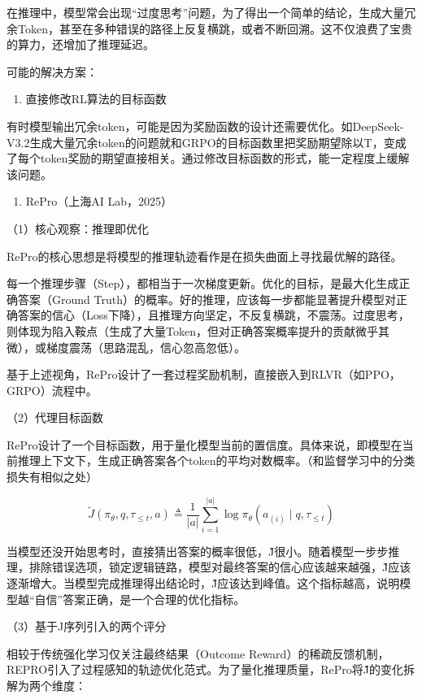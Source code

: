 在推理中，模型常会出现``过度思考''问题，为了得出一个简单的结论，生成大量冗余Token，甚至在多种错误的路径上反复横跳，或者不断回溯。这不仅浪费了宝贵的算力，还增加了推理延迟。

可能的解决方案：

\begin{enumerate}
\def\labelenumi{\arabic{enumi}.}
\tightlist
\item
  直接修改RL算法的目标函数
\end{enumerate}

有时模型输出冗余token，可能是因为奖励函数的设计还需要优化。如DeepSeek-V3.2生成大量冗余token的问题就和GRPO的目标函数里把奖励期望除以T，变成了每个token奖励的期望直接相关。通过修改目标函数的形式，能一定程度上缓解该问题。

\begin{enumerate}
\def\labelenumi{\arabic{enumi}.}
\setcounter{enumi}{1}
\tightlist
\item
  RePro（上海AI Lab，2025）
\end{enumerate}

（1）核心观察：推理即优化

RePro的核心思想是将模型的推理轨迹看作是在损失曲面上寻找最优解的路径。

每一个推理步骤（Step），都相当于一次梯度更新。优化的目标，是最大化生成正确答案（Ground Truth）的概率。好的推理，应该每一步都能显著提升模型对正确答案的信心（Loss下降），且推理方向坚定，不反复横跳，不震荡。过度思考，则体现为陷入鞍点（生成了大量Token，但对正确答案概率提升的贡献微乎其微），或梯度震荡（思路混乱，信心忽高忽低）。

基于上述视角，RePro设计了一套过程奖励机制，直接嵌入到RLVR（如PPO，GRPO）流程中。

（2）代理目标函数

RePro设计了一个目标函数，用于量化模型当前的置信度。具体来说，即模型在当前推理上下文下，生成正确答案各个token的平均对数概率。（和监督学习中的分类损失有相似之处）

\[
\tilde{J}(\pi_\theta, q, \tau_{\le t}, a)
\triangleq
\frac{1}{|a|}\sum_{i=1}^{|a|}
\log \pi_\theta(a_{(i)} \mid q, \tau_{\le t})
\]

当模型还没开始思考时，直接猜出答案的概率很低，J̃很小。随着模型一步步推理，排除错误选项，锁定逻辑链路，模型对最终答案的信心应该越来越强，J̃应该逐渐增大。当模型完成推理得出结论时，J̃应该达到峰值。这个指标越高，说明模型越``自信''答案正确，是一个合理的优化指标。

（3）基于J序列引入的两个评分

相较于传统强化学习仅关注最终结果（Outcome Reward）的稀疏反馈机制，REPRO引入了过程感知的轨迹优化范式。为了量化推理质量，RePro将J̃的变化拆解为两个维度：

